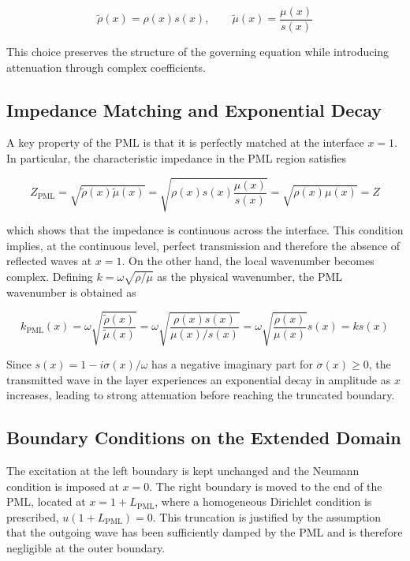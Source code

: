 \begin{equation}
    \tilde{\rho}(x) = \rho(x)s(x),
    \qquad
    \tilde{\mu}(x) = \frac{\mu(x)}{s(x)}
    \label{eq:pml_coeffs}
\end{equation}

This choice preserves the structure of the governing equation while introducing attenuation through complex coefficients.

\subsection{Impedance Matching and Exponential Decay}

A key property of the PML is that it is perfectly matched at the interface \(x = 1\). In particular, the characteristic impedance in the PML region satisfies

\begin{equation}
    Z_{\mathrm{PML}}
    = \sqrt{\tilde{\rho}(x)\tilde{\mu}(x)}
    = \sqrt{\rho(x)s(x)\frac{\mu(x)}{s(x)}}
    = \sqrt{\rho(x)\mu(x)}
    = Z
    \label{eq:pml_impedance}
\end{equation}

which shows that the impedance is continuous across the interface. This condition implies, at the continuous level, perfect transmission and therefore the absence of reflected waves at \(x = 1\). On the other hand, the local wavenumber becomes complex. Defining \(k = \omega\sqrt{\rho/\mu}\) as the physical wavenumber, the PML wavenumber is obtained as

\begin{equation}
    k_{\mathrm{PML}}(x)
    = \omega\sqrt{\frac{\tilde{\rho}(x)}{\tilde{\mu}(x)}}
    = \omega\sqrt{\frac{\rho(x)s(x)}{\mu(x)/s(x)}}
    = \omega\sqrt{\frac{\rho(x)}{\mu(x)}}s(x)
    = ks(x)
    \label{eq:pml_wavenumber}
\end{equation}

Since \(s(x) = 1 - i\sigma(x)/\omega\) has a negative imaginary part for \(\sigma(x) \geq 0\), the transmitted wave in the layer experiences an exponential decay in amplitude as \(x\) increases, leading to strong attenuation before reaching the truncated boundary.

\subsection{Boundary Conditions on the Extended Domain}

The excitation at the left boundary is kept unchanged and the Neumann condition is imposed at \(x = 0\). The right boundary is moved to the end of the PML, located at \(x = 1 + L_{\mathrm{PML}}\), where a homogeneous Dirichlet condition is prescribed, \(u(1 + L_{\mathrm{PML}}) = 0\). This truncation is justified by the assumption that the outgoing wave has been sufficiently damped by the PML and is therefore negligible at the outer boundary.

